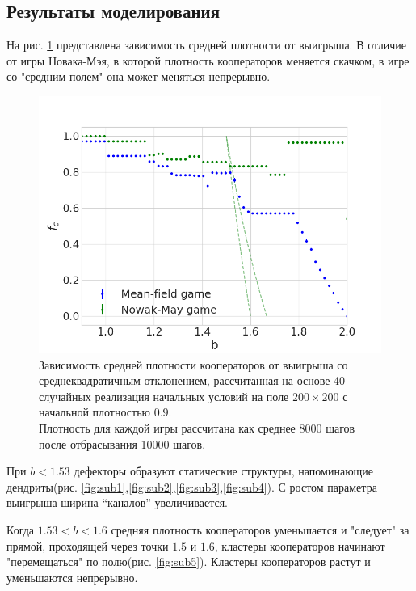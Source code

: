 \documentclass[12pt]{article}
\begin{document}
\subsection{Результаты моделирования}
    На рис. \ref{fig:payoffvsdensity} представлена зависимость средней плотности от выигрыша. В отличие от игры Новака-Мэя, в которой плотность кооператоров меняется скачком\cite{KOLOTEV2018}, в игре со "средним полем" она может меняться непрерывно.
    \begin{figure}[!h]
        \centering
        \captionsetup{justification=centering}
        \includegraphics[width=\textwidth]{MeanFieldGame/density_NovakMay_Mean_game.png}
        \caption{Зависимость средней плотности кооператоров от выигрыша со среднеквадратичным отклонением, рассчитанная на основе 40 случайных реализация начальных условий на поле $200\times200$ с начальной плотностью $0.9$.\\
        Плотность для каждой игры рассчитана как среднее 8000 шагов после отбрасывания 10000 шагов. 
        }
        \label{fig:payoffvsdensity}
    \end{figure}

    При $b < 1.53$ дефекторы образуют статические структуры, напоминающие дендриты(рис. \ref{fig:sub1},\ref{fig:sub2},\ref{fig:sub3},\ref{fig:sub4}). С ростом параметра выигрыша ширина “каналов” увеличивается.

    Когда $1.53<b<1.6$ средняя плотность кооператоров уменьшается и "следует" за прямой, проходящей через точки $1.5$ и $1.6$, кластеры кооператоров начинают "перемещаться" по полю(рис. \ref{fig:sub5}). Кластеры кооператоров растут и уменьшаются непрерывно.
\end{document}
